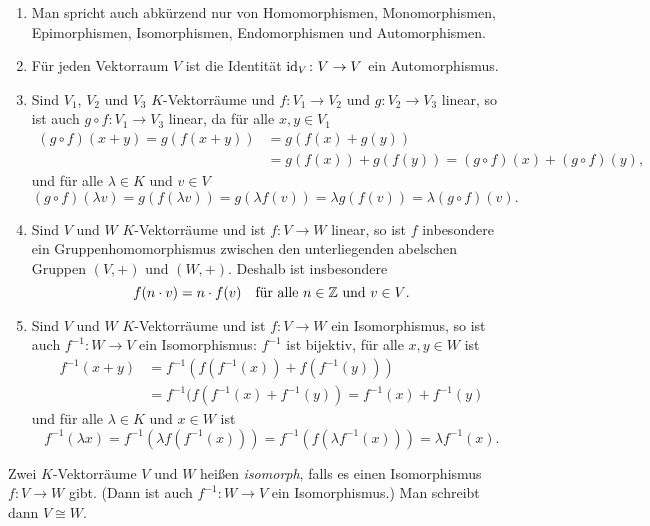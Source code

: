 \begin{bem}
 \begin{enumerate}[leftmargin=*]
  \item
   Man spricht auch abkürzend nur von Homomorphismen, Monomorphismen, Epimorphismen, Isomorphismen, Endomorphismen und Automorphismen.
  \item
   Für jeden Vektorraum $V$ ist die Identität $\mathrm{id}_V \colon V \to V$ ein Automorphismus.
  \item
   Sind $V_1$, $V_2$ und $V_3$ $K$-Vektorräume und $f \colon V_1 \to V_2$ und $g \colon V_2 \to V_3$ linear, so ist auch $g \circ f \colon V_1 \to V_3$ linear, da für alle $x,y \in V_1$
   \begin{align*}
    (g \circ f)(x+y)
    = g(f(x+y))
    &= g(f(x)+g(y)) \\
    &= g(f(x)) + g(f(y))
    = (g \circ f)(x) + (g \circ f)(y),
   \end{align*}
   und für alle $\lambda \in K$ und $v \in V$
   \[
    (g \circ f)(\lambda v)
    = g(f(\lambda v))
    = g(\lambda f(v))
    = \lambda g(f(v))
    = \lambda (g \circ f)(v).
   \]
  \item
   Sind $V$ und $W$ $K$-Vektorräume und ist $f \colon V \to W$ linear, so ist $f$ inbesondere ein Gruppenhomomorphismus zwischen den unterliegenden abelschen Gruppen $(V,+)$ und $(W,+)$. Deshalb ist insbesondere
   \[
    f(n \cdot v) = n \cdot f(v)
    \quad
    \text{für alle $n \in \mathbb{Z}$ und $v \in V$}.
   \]
  \item
   Sind $V$ und $W$ $K$-Vektorräume und ist $f \colon V \to W$ ein Isomorphismus, so ist auch $f^{-1} \colon W \to V$ ein Isomorphismus: $f^{-1}$ ist bijektiv, für alle $x,y \in W$ ist
   \begin{align*}
    f^{-1}(x+y)
    &= f^{-1}( f(f^{-1}(x)) + f(f^{-1}(y)) ) \\
    &= f^{-1}(f( f^{-1}(x) + f^{-1}(y) )
    = f^{-1}(x) + f^{-1}(y)
   \end{align*}
   und für alle $\lambda \in K$ und $x \in W$ ist
   \[
    f^{-1}(\lambda x)
    = f^{-1}(\lambda f(f^{-1}(x)) )
    = f^{-1}(f( \lambda f^{-1}(x)))
    = \lambda f^{-1}(x).
   \]
 \end{enumerate}
\end{bem}


\begin{defi}
 Zwei $K$-Vektorräume $V$ und $W$ heißen \emph{isomorph}, falls es einen Isomorphismus $f \colon V \to W$ gibt. (Dann ist auch $f^{-1} \colon W \to V$ ein Isomorphismus.) Man schreibt dann $V \cong W$.
\end{defi}


